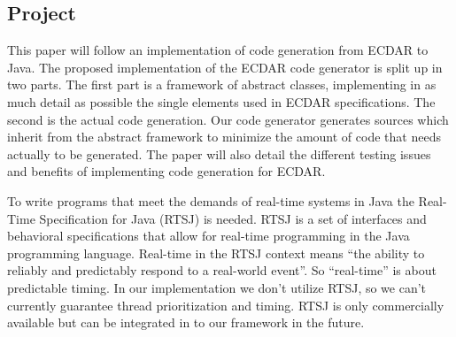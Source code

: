 \subsection{Project}
\label{introduction-problemfield}
This paper will follow an implementation of code generation from ECDAR to
Java. The proposed implementation of the ECDAR code generator is split up in two
parts. The first part is a framework of abstract classes, implementing in as
much detail as possible the single elements used in ECDAR specifications. The
second is the actual code generation. Our code generator generates sources which
inherit from the abstract framework to minimize the amount of code that needs
actually to be generated. The paper will also detail the different testing
issues and benefits of implementing code generation for ECDAR.

To write programs that meet the demands of real-time systems in Java the
Real-Time Specification for Java (RTSJ) is needed. RTSJ is a set of interfaces
and behavioral specifications that allow for real-time programming in the Java
programming language.  Real-time in the RTSJ context means ``the ability to
reliably and predictably respond to a real-world event''.  So ``real-time'' is
about predictable timing. In our implementation we don't utilize RTSJ, so we
can't currently guarantee thread prioritization and timing. RTSJ is only
commercially available but can be integrated in to our framework in the future.
